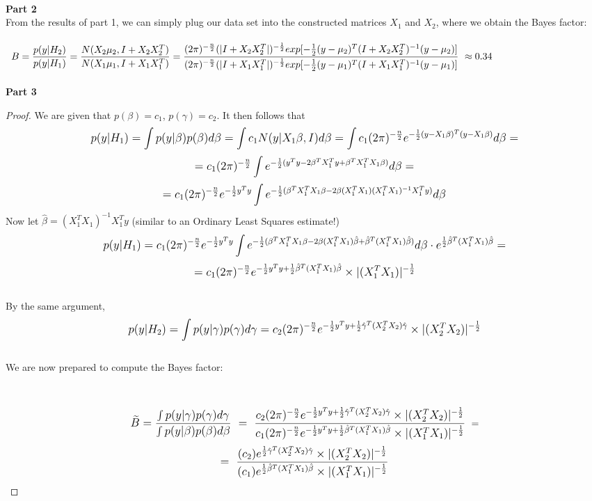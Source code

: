 \documentclass[10pt,a4paper]{article}
\begin{document}
\\
\textbf{Part 2} \\
From the results of part 1, we can simply plug our data set into the constructed matrices $X_1$ and $X_2$, where we obtain the Bayes factor:\\
\\\
$B=\dfrac{p(y|H_2)}{p(y|H_1)}=\dfrac{N(X_2\mu_2,I+X_2 X_2^T)}{N(X_1\mu_1,I+X_1 X_1^T)}
=\dfrac{(2\pi)^{-\frac{n}{2}}(|I+X_2 X_2^T|)^{-\frac{1}{2}}exp[-\frac{1}{2}(y-\mu_2)^T(I+X_2 X_2^T)^{-1}(y-\mu_2)]}{(2\pi)^{-\frac{n}{2}}(|I+X_1 X_1^T|)^{-\frac{1}{2}}exp[-\frac{1}{2}(y-\mu_1)^T(I+X_1 X_1^T)^{-1}(y-\mu_1)]}\\
\\\
 \approx 0.34$\\
\\
\textbf{Part 3}
\begin{proof}
We are given that $p(\beta)=c_1$, $p(\gamma)=c_2$. It then follows that
$$\mathlarger{p(y|H_1) = \int p(y|\beta)p(\beta)d\beta = \int c_1 N(y|X_1\beta,I) d\beta = \int c_1 (2\pi)^{-\frac{n}{2}}e^{-\frac{1}{2}(y-X_1\beta)^T(y-X_1\beta)} d\beta =}$$ $$\mathlarger{ = c_1 (2\pi)^{-\frac{n}{2}}\int e^{-\frac{1}{2}(y^Ty-2\beta^TX_1^Ty+\beta^TX_1^TX_1\beta)}d\beta = }$$ $$\mathlarger{ = c_1 (2\pi)^{-\frac{n}{2}}e^{-\frac{1}{2}y^Ty} \int e^{-\frac{1}{2}(\beta^TX_1^TX_1\beta-2\beta (X_1^TX_1) (X_1^TX_1)^{-1}X_1^Ty )}d\beta}$$
Now let $\hat{\beta}=(X_1^TX_1)^{-1}X_1^Ty$ (similar to an Ordinary Least Squares estimate!)\\
$$\mathlarger{p(y|H_1)=c_1 (2\pi)^{-\frac{n}{2}}e^{-\frac{1}{2}y^Ty} \int e^{-\frac{1}{2}(\beta^TX_1^TX_1\beta-2\beta (X_1^TX_1)\hat{\beta}+\hat{\beta}^T(X_1^TX_1)\hat{\beta} )}d\beta \cdot e^{\frac{1}{2}\hat{\beta}^T(X_1^TX_1)\hat{\beta}} =}$$ $$\mathlarger{ = c_1 (2\pi)^{-\frac{n}{2}} e^{-\frac{1}{2}y^Ty+\frac{1}{2}\hat{\beta}^T(X_1^TX_1)\hat{\beta}}\times|(X_1^TX_1)|^{-\frac{1}{2}}}$$\\
By the same argument,\\
$$\mathlarger{p(y|H_2)=\int p(y|\gamma)p(\gamma)d\gamma =c_2 (2\pi)^{-\frac{n}{2}} e^{-\frac{1}{2}y^Ty+\frac{1}{2}\hat{\gamma}^T(X_2^TX_2)\hat{\gamma}}\times|(X_2^TX_2)|^{-\frac{1}{2}}}$$\\
We are now prepared to compute the Bayes factor:\\
\\\
$$\mathlarger{\widetilde{B}=\dfrac{\int p(y|\gamma)p(\gamma)d\gamma}{\int p(y|\beta)p(\beta)d\beta} \ = \ \dfrac{c_2 (2\pi)^{-\frac{n}{2}} e^{-\frac{1}{2}y^Ty+\frac{1}{2}\hat{\gamma}^T(X_2^TX_2)\hat{\gamma}}\times|(X_2^TX_2)|^{-\frac{1}{2}}}{c_1 (2\pi)^{-\frac{n}{2}} e^{-\frac{1}{2}y^Ty+\frac{1}{2}\hat{\beta}^T(X_1^TX_1)\hat{\beta}}\times|(X_1^TX_1)|^{-\frac{1}{2}}}} \ =$$ $$\mathlarger{ = \ \dfrac{(c_2) e^{\frac{1}{2}\hat{\gamma}^T(X_2^TX_2)\hat{\gamma}}\times|(X_2^TX_2)|^{-\frac{1}{2}}}{(c_1)  e^{\frac{1}{2}\hat{\beta}^T(X_1^TX_1)\hat{\beta}}\times|(X_1^TX_1)|^{-\frac{1}{2}}}}$$

\end{proof}
\end{document}
